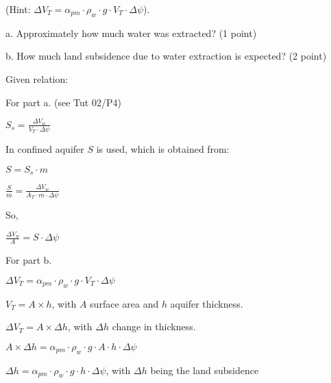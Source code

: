 \documentclass[letterpaper,10pt,english]{jupyterBook}
\begin{document}
\sphinxAtStartPar
(Hint: \(\Delta V_T = \alpha_{pm}\cdot\rho_w \cdot g \cdot  V_T \cdot  \Delta \psi \)).

\sphinxAtStartPar
a. Approximately how much water was extracted? (1 point)

\sphinxAtStartPar
b. How much land subsidence due to water extraction is expected? (2 point)

\sphinxAtStartPar
{}

\sphinxAtStartPar
Given relation:

\sphinxAtStartPar
For part a. (see Tut 02/P4)

\sphinxAtStartPar
\(
S_s  = \frac{\Delta V_w}{V_T\cdot \Delta \psi}
\)

\sphinxAtStartPar
In confined aquifer \(S\) is used, which is obtained from:

\sphinxAtStartPar
\(S = S_s \cdot m\)

\sphinxAtStartPar
\(
 \frac{S}{m} = \frac{\Delta V_w}{A_T\cdot m \cdot \Delta \psi}
\)

\sphinxAtStartPar
So,

\sphinxAtStartPar
\(  \frac{\Delta V_w}{A}  = S \cdot \Delta \psi\)

\sphinxAtStartPar
For part b.

\sphinxAtStartPar
\(\Delta V_T = \alpha_{pm}\cdot\rho_w \cdot g \cdot  V_T \cdot  \Delta \psi \)

\sphinxAtStartPar
\(V_T = A\times h\), with \(A\) surface area and \(h\) aquifer thickness.

\sphinxAtStartPar
\(\Delta V_T = A \times \Delta h\), with \(\Delta h\) change in thickness.

\sphinxAtStartPar
\(A \times \Delta h= \alpha_{pm}\cdot\rho_w \cdot g \cdot  A \cdot h \cdot  \Delta \psi \)

\sphinxAtStartPar
\(\Delta h = \alpha_{pm}\cdot\rho_w \cdot g \cdot h \cdot  \Delta \psi\), with \(\Delta h\) being the land subsidence
\end{document}
